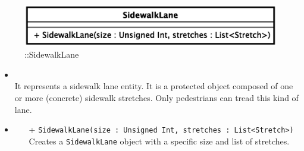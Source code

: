 \begin{figure}[h]
\centering
\includegraphics[scale=0.6,keepaspectratio]{images/solution/sidewalk_lane.eps}
\caption{\pReactiveComponentLane::SidewalkLane}
\label{fig:sd-app-sidewalk_lane}
\end{figure}
\FloatBarrier
\begin{itemize}
  \item \textbf{\descr} \\
    It represents a sidewalk lane entity. It is a protected object composed of
    one or more (concrete) sidewalk stretches. Only pedestrians can tread this
    kind of lane.
  \item \textbf{\ops}
  \begin{itemize}
  \item[+] \texttt{SidewalkLane(size : Unsigned Int, stretches : List<Stretch>)} \\
  Creates a \texttt{SidewalkLane} object with a specific size and list of stretches.
  \end{itemize}
\end{itemize}
